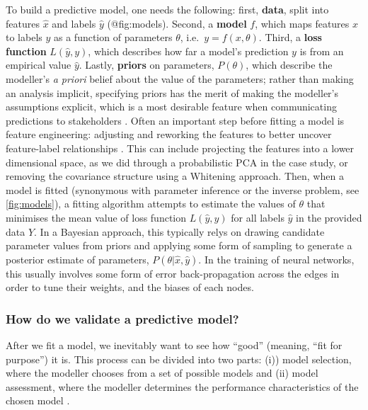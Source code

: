 To build a predictive model, one needs the following: first,
\textbf{data}, split into features \(\hat{x}\) and labels \(\hat{y}\)
(@fig:models). Second, a \textbf{model} \(f\), which maps features \(x\)
to labels \(y\) as a function of parameters \(\theta\),
i.e.~\(y = f(x, \theta)\). Third, a \textbf{loss function}
\(L(\hat{y}, y)\), which describes how far a model's prediction \(y\) is
from an empirical value \(\hat{y}\). Lastly, \textbf{priors} on
parameters, \(P(\theta)\), which describe the modeller's \emph{a priori}
belief about the value of the parameters; rather than making an analysis
implicit, specifying priors has the merit of making the modeller's
assumptions explicit, which is a most desirable feature when
communicating predictions to stakeholders
\cite{Spiegelhalter2000BayMet}. Often an important step before fitting a
model is feature engineering: adjusting and reworking the features to
better uncover feature-label relationships \cite{Kuhn2019FeaEng}. This
can include projecting the features into a lower dimensional space, as
we did through a probabilistic PCA in the case study, or removing the
covariance structure using a Whitening approach. Then, when a model is
fitted (synonymous with parameter inference or the inverse problem, see
\autoref{fig:models}), a fitting algorithm attempts to estimate the values of
\(\theta\) that minimises the mean value of loss function
\(L(\hat{y},y)\) for all labels \(\hat{y}\) in the provided data \(Y\).
In a Bayesian approach, this typically relys on drawing candidate
parameter values from priors and applying some form of sampling to
generate a posterior estimate of parameters,
\(P(\theta | \hat{x}, \hat{y})\). In the training of neural networks,
this usually involves some form of error back-propagation across the
edges in order to tune their weights, and the biases of each nodes.

\subsubsection{How do we validate a predictive
model?}\label{how-do-we-validate-a-predictive-model}

After we fit a model, we inevitably want to see how ``good'' (meaning,
``fit for purpose'') it is. This process can be divided into two parts:
(i)) model selection, where the modeller chooses from a set of possible
models and (ii) model assessment, where the modeller determines the
performance characteristics of the chosen model \cite{Hastie2009EleSta}.

